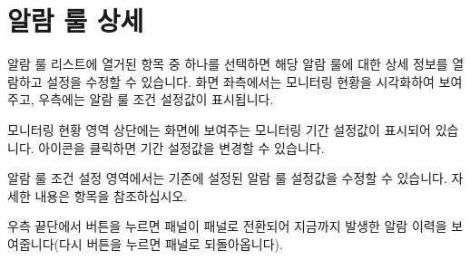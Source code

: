 \documentclass[letterpaper,10pt,english]{sphinxmanual}
\begin{document}
\section{알람 룰 상세}
\label{\detokenize{anomaly/part04/index:alarm-rule-details}}\label{\detokenize{anomaly/part04/index:id3}}
알람 룰 리스트에 열거된 항목 중 하나를 선택하면 해당 알람 룰에 대한 상세 정보를 열람하고 설정을 수정할 수 있습니다. 화면 좌측에서는 모니터링 현황을 시각화하여 보여주고, 우측에는 알람 룰 조건 설정값이 표시됩니다.
\begin{quote}

\begin{figure}[H]
\centering

\noindent{}
\end{figure}
\end{quote}

모니터링 현황 영역 상단에는 화면에 보여주는 모니터링 기간 설정값이 표시되어 있습니다.  아이콘을 클릭하면 기간 설정값을 변경할 수 있습니다.
\begin{quote}

\begin{figure}[H]
\centering

\noindent{}
\end{figure}
\end{quote}

알람 룰 조건 설정 영역에서는 기존에 설정된 알람 룰 설정값을 수정할 수 있습니다. 자세한 내용은 {\hyperref[\detokenize{anomaly/part02/index:alarm-rule-settings}]{}} 항목을 참조하십시오.
\begin{quote}

\begin{figure}[H]
\centering

\noindent{}
\end{figure}
\end{quote}

우측 끝단에서  버튼을 누르면  패널이  패널로 전환되어 지금까지 발생한 알람 이력을 보여줍니다(다시  버튼을 누르면  패널로 되돌아옵니다).
\begin{quote}

\begin{figure}[H]
\centering

\noindent{}
\end{figure}
\end{quote}
\end{document}
